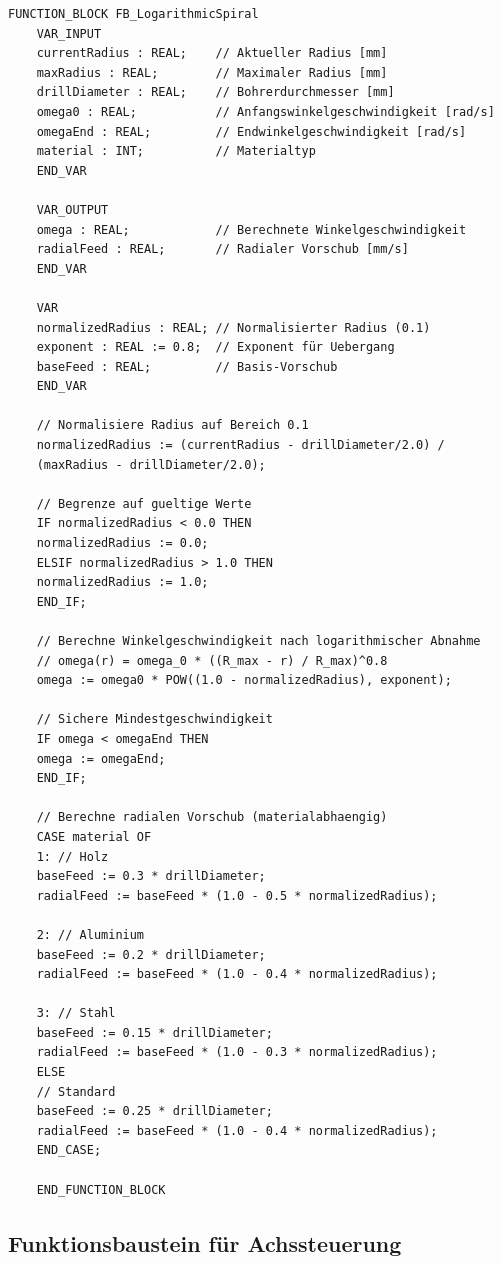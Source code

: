 ﻿\documentclass[12pt,a4paper]{article}
\begin{document}
\begin{lstlisting}[style=structuredtext, caption={Funktionsbaustein für logarithmische Spiralparameter}, label={lst:spiral}]
	FUNCTION_BLOCK FB_LogarithmicSpiral
	VAR_INPUT
	currentRadius : REAL;    // Aktueller Radius [mm]
	maxRadius : REAL;        // Maximaler Radius [mm]
	drillDiameter : REAL;    // Bohrerdurchmesser [mm]
	omega0 : REAL;           // Anfangswinkelgeschwindigkeit [rad/s]
	omegaEnd : REAL;         // Endwinkelgeschwindigkeit [rad/s]
	material : INT;          // Materialtyp
	END_VAR
	
	VAR_OUTPUT
	omega : REAL;            // Berechnete Winkelgeschwindigkeit
	radialFeed : REAL;       // Radialer Vorschub [mm/s]
	END_VAR
	
	VAR
	normalizedRadius : REAL; // Normalisierter Radius (0.1)
	exponent : REAL := 0.8;  // Exponent für Uebergang
	baseFeed : REAL;         // Basis-Vorschub
	END_VAR
	
	// Normalisiere Radius auf Bereich 0.1
	normalizedRadius := (currentRadius - drillDiameter/2.0) / 
	(maxRadius - drillDiameter/2.0);
	
	// Begrenze auf gueltige Werte
	IF normalizedRadius < 0.0 THEN
	normalizedRadius := 0.0;
	ELSIF normalizedRadius > 1.0 THEN
	normalizedRadius := 1.0;
	END_IF;
	
	// Berechne Winkelgeschwindigkeit nach logarithmischer Abnahme
	// omega(r) = omega_0 * ((R_max - r) / R_max)^0.8
	omega := omega0 * POW((1.0 - normalizedRadius), exponent);
	
	// Sichere Mindestgeschwindigkeit
	IF omega < omegaEnd THEN
	omega := omegaEnd;
	END_IF;
	
	// Berechne radialen Vorschub (materialabhaengig)
	CASE material OF
	1: // Holz
	baseFeed := 0.3 * drillDiameter;
	radialFeed := baseFeed * (1.0 - 0.5 * normalizedRadius);
	
	2: // Aluminium
	baseFeed := 0.2 * drillDiameter;
	radialFeed := baseFeed * (1.0 - 0.4 * normalizedRadius);
	
	3: // Stahl
	baseFeed := 0.15 * drillDiameter;
	radialFeed := baseFeed * (1.0 - 0.3 * normalizedRadius);
	ELSE
	// Standard
	baseFeed := 0.25 * drillDiameter;
	radialFeed := baseFeed * (1.0 - 0.4 * normalizedRadius);
	END_CASE;
	
	END_FUNCTION_BLOCK
\end{lstlisting}

\subsection{Funktionsbaustein für Achssteuerung}
\end{document}

